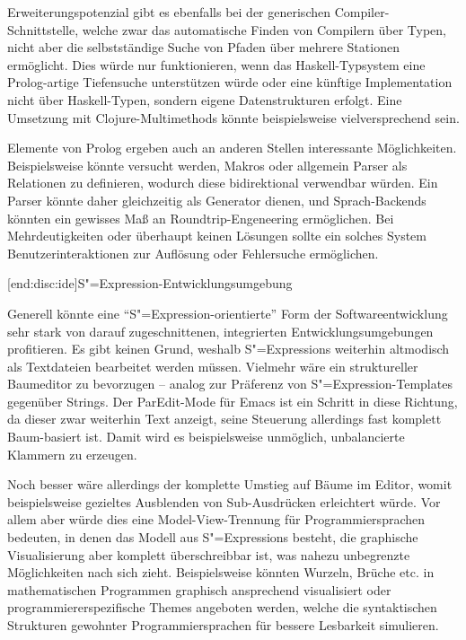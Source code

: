 \documentclass[11pt, a4paper, bibgerm]{scrbook}
\newcommand\lsubsection{}
\newcommand{\sexp}{S"=Expression}
\newcommand{\sexps}{S"=Expressions}
\begin{document}
Erweiterungspotenzial gibt es ebenfalls bei der generischen
Compiler-Schnittstelle, welche zwar das automatische Finden von
Compilern über Typen, nicht aber die selbstständige Suche von Pfaden
über mehrere Stationen ermöglicht. Dies würde nur funktionieren, wenn
das Haskell-Typsystem eine Prolog-artige Tiefensuche \cite{Prolog}
unterstützen würde oder eine künftige Implementation nicht über
Haskell-Typen, sondern eigene Datenstrukturen erfolgt. Eine Umsetzung
mit Clojure-Multimethods \cite[S. 246ff]{Clojure} könnte beispielsweise
vielversprechend sein.

Elemente von Prolog ergeben auch an anderen Stellen interessante
Möglichkeiten. Beispielsweise könnte versucht werden, Makros oder
allgemein Parser als Relationen zu definieren, wodurch diese
bidirektional verwendbar würden. Ein Parser könnte daher gleichzeitig
als Generator dienen, und Sprach-Backends könnten ein gewisses Maß an
Roundtrip-Engeneering \cite{Roundtrip} ermöglichen. Bei Mehrdeutigkeiten
oder überhaupt keinen Lösungen sollte ein solches System
Benutzerinteraktionen zur Auflösung oder Fehlersuche ermöglichen.

\lsubsection[end:disc:ide]{\sexp{}-Entwicklungsumgebung}

Generell könnte eine ``\sexp{}-orientierte'' Form der
Softwareentwicklung sehr stark von darauf zugeschnittenen, integrierten
Entwicklungsumgebungen profitieren. Es gibt keinen Grund, weshalb
\sexps{} weiterhin altmodisch als Textdateien bearbeitet werden
müssen. Vielmehr wäre ein struktureller Baumeditor zu bevorzugen --
analog zur Präferenz von \sexp{}-Templates gegenüber Strings. Der
ParEdit-Mode \cite{Paredit} für Emacs \cite{Emacs} ist ein Schritt in
diese Richtung, da dieser zwar weiterhin Text anzeigt, seine Steuerung
allerdings fast komplett Baum-basiert ist. Damit wird es beispielsweise
unmöglich, unbalancierte Klammern zu erzeugen.

Noch besser wäre allerdings der komplette Umstieg auf Bäume im Editor,
womit beispielsweise gezieltes Ausblenden von Sub-Ausdrücken erleichtert
würde. Vor allem aber würde dies eine Model-View-Trennung für
Programmiersprachen bedeuten, in denen das Modell aus \sexps{} besteht,
die graphische Visualisierung aber komplett überschreibbar ist, was
nahezu unbegrenzte Möglichkeiten nach sich zieht. Beispielsweise könnten
Wurzeln, Brüche etc. in mathematischen Programmen graphisch ansprechend
visualisiert oder programmiererspezifische Themes angeboten werden,
welche die syntaktischen Strukturen gewohnter Programmiersprachen für
bessere Lesbarkeit simulieren.
\end{document}
